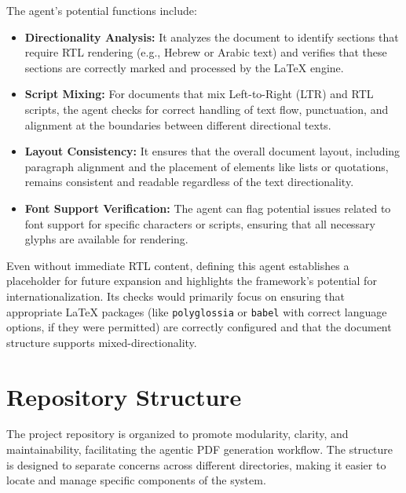 \documentclass{custom-academic-template}
\begin{document}
The agent's potential functions include:
\begin{itemize}
    \item 	\textbf{Directionality Analysis:} It analyzes the document to identify sections that require RTL rendering (e.g., Hebrew or Arabic text) and verifies that these sections are correctly marked and processed by the LaTeX engine.
    \item 	\textbf{Script Mixing:} For documents that mix Left-to-Right (LTR) and RTL scripts, the agent checks for correct handling of text flow, punctuation, and alignment at the boundaries between different directional texts.
    \item 	\textbf{Layout Consistency:} It ensures that the overall document layout, including paragraph alignment and the placement of elements like lists or quotations, remains consistent and readable regardless of the text directionality.
    \item 	\textbf{Font Support Verification:} The agent can flag potential issues related to font support for specific characters or scripts, ensuring that all necessary glyphs are available for rendering.
\end{itemize}
Even without immediate RTL content, defining this agent establishes a placeholder for future expansion and highlights the framework's potential for internationalization. Its checks would primarily focus on ensuring that appropriate LaTeX packages (like 	\texttt{polyglossia} or 	\texttt{babel} with correct language options, if they were permitted) are correctly configured and that the document structure supports mixed-directionality.

\section{Repository Structure}
The project repository is organized to promote modularity, clarity, and maintainability, facilitating the agentic PDF generation workflow. The structure is designed to separate concerns across different directories, making it easier to locate and manage specific components of the system.
\end{document}
